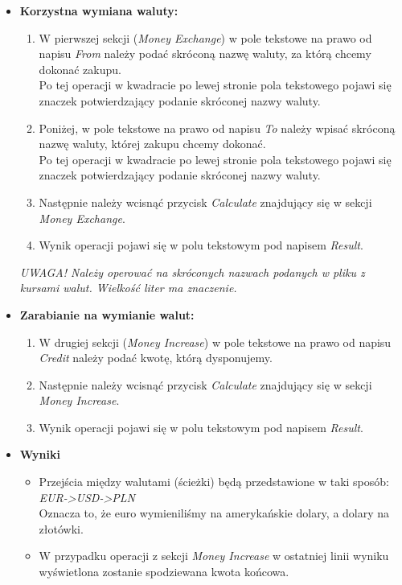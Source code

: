 \documentclass[a4paper,11pt]{article}
\begin{document}
\begin{itemize}
\item  \textbf{Korzystna wymiana waluty:}
\begin{enumerate}
\item W pierwszej sekcji (\textit{Money Exchange}) w pole tekstowe na prawo od napisu \textit{From} należy podać skróconą nazwę waluty, za którą chcemy dokonać zakupu.
\\ Po tej operacji w kwadracie po lewej stronie pola tekstowego pojawi się znaczek potwierdzający podanie skróconej nazwy waluty.
\item Poniżej, w pole tekstowe na prawo od napisu \textit{To} należy wpisać skróconą nazwę waluty, której zakupu chcemy dokonać.
\\ Po tej operacji w kwadracie po lewej stronie pola tekstowego pojawi się znaczek potwierdzający podanie skróconej nazwy waluty.
\item Następnie należy wcisnąć przycisk \textit{Calculate} znajdujący się w sekcji \textit{Money Exchange}.
\item Wynik operacji pojawi się w polu tekstowym pod napisem \textit{Result}.
\end{enumerate}
\textit{UWAGA! Należy operować na skróconych nazwach podanych w pliku z kursami walut. Wielkość liter ma znaczenie.}
\newpage
\item  \textbf{Zarabianie na wymianie walut:}
\begin{enumerate}
\item W drugiej sekcji (\textit{Money Increase}) w pole tekstowe na prawo od napisu \textit{Credit} należy podać kwotę, którą dysponujemy.
\item Następnie należy wcisnąć przycisk \textit{Calculate} znajdujący się w sekcji \textit{Money Increase}.
\item Wynik operacji pojawi się w polu tekstowym pod napisem \textit{Result}.
\end{enumerate}
\item\textbf{ Wyniki}
\begin{itemize}
\item Przejścia między walutami (ścieżki) będą przedstawione w taki sposób: \emph{EUR->USD->PLN}
\\Oznacza to, że euro wymieniliśmy na amerykańskie dolary, a dolary na złotówki.
\item W przypadku operacji z sekcji \textit{Money Increase} w ostatniej linii wyniku wyświetlona zostanie spodziewana kwota końcowa.
\end{itemize}
\end{itemize}
\end{document}
